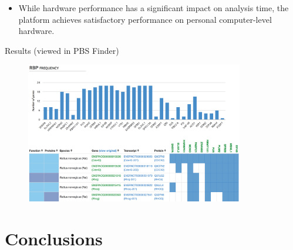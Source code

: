 \documentclass{beamer}
\begin{document}
\begin{frame}[allowframebreaks]
\begin{itemize}
\item
While hardware performance has a significant impact on analysis time, the
platform achieves satisfactory performance on personal computer-level hardware.
\end{itemize}

\framebreak

Results (viewed in PBS Finder)\\
\begin{figure}
  \centering
  \includegraphics[width=0.85\textwidth]{job_view}
\end{figure}


\end{frame}


\section{Conclusions}
\end{document}

